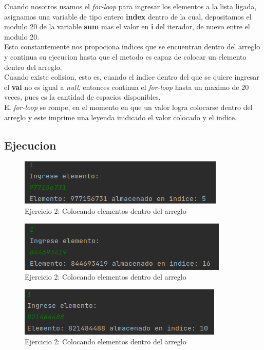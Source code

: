 \documentclass{article}
\begin{document}
			Cuando nosotros usamos el \textit{for-loop} para ingresar los elementos a la lista ligada, asignamos una variable de tipo entero \textbf{index} dentro de la cual, depositamos el modulo 20 de la variable \textbf{sum} mas el valor en \textbf{i} del iterador, de nuevo entre el modulo 20.\\
			
			Esto constantemente nos propociona indices que se encuentran dentro del arreglo y continua su ejecucion hasta que el metodo es capaz de colocar un elemento dentro del arreglo.\\
			
			Cuando existe colision, esto es, cuando el indice dentro del que se quiere ingresar el \textbf{val} no es igual a \textit{null}, entonces continua el \textit{for-loop} hasta un maximo de 20 veces, pues es la cantidad de espacios disponibles.\\
			
			El \textit{for-loop} se rompe, en el momento en que un valor logra colocarse dentro del arreglo y este imprime una leyenda inidicado el valor colocado y el indice. 
		
		\subsection{Ejecucion}

			\begin{figure}[H]
				\centering
				\includegraphics{images/e22.png}
				\caption*{Ejercicio 2: Colocando elementos dentro del arreglo}
			\end{figure}
			
			\begin{figure}[H]
				\centering
				\includegraphics{images/e23.png}
				\caption*{Ejercicio 2: Colocando elementos dentro del arreglo}
			\end{figure}
			
			\begin{figure}[H]
				\centering
				\includegraphics{images/e24.png}
				\caption*{Ejercicio 2: Colocando elementos dentro del arreglo}
			\end{figure}
			
\end{document}
